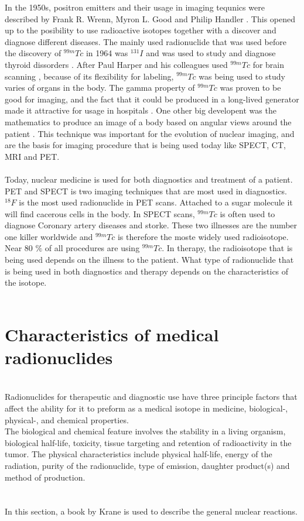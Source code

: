 \documentclass[twoside,english]{uiofysmaster/uiofysmaster}
\begin{document}
In the 1950s,  positron emitters and their usage in imaging tequnics were described by Frank R. Wrenn, Myron L. Good and Philip Handler \cite{Wrenn1951}. This opened up to the posibility to use radioactive isotopes together with a discover and diagnose different diseases. The mainly used radionuclide that was used before the discovery of $^{99m}Tc$ in 1964 \cite{harper_tc99m} was $^{131}I$ and was used to study and diagnose thyroid dissorders \cite{Cherry2012_chap1}. After Paul Harper and his colleagues used $^{99m}Tc$ for brain scanning \cite{harper_tc99m},  because of its flexibility for labeling, $^{99m}Tc$ was being used to study varies of organs in the body. The gamma property of $^{99m}Tc$ was proven to be good for imaging, and the fact that it could be produced in a long-lived generator made it attractive for usage in hospitals \cite{harper_tc99m}. One other big developent was the mathematics to produce an image of a body based on angular views around the patient \cite{Cherry2012_chap1}. This technique was important for the evolution of nuclear imaging, and are the basis for imaging procedure that is being used today like SPECT, CT, MRI and PET.
\\
\\
Today, nuclear medicine is used for both diagnostics and treatment of a patient. PET and SPECT is two imaging techniques that are most used in diagnostics. $^{18}F$ is the most used radionuclide in PET scans. Attached to a sugar molecule it will find cacerous cells in the body. In SPECT scans, $^{99m}Tc$ is often used to diagnose Coronary artery diseases and storke. These two illnesses are the number one killer worldwide and $^{99m}Tc$ is therefore the moste widely used radioisotope. Near 80 $\%$ of all procedures are using $^{99m}Tc$. In therapy, the radioisotope that is being used depends on the illness to the patient. What type of radionuclide that is being used in both diagnostics and therapy depends on the characteristics of the isotope.   
\\
\\

\section{Characteristics of medical radionuclides}
\noindent
\\
Radionuclides for therapeutic and diagnostic use have three principle factors that affect the ability for it to preform as a medical isotope in medicine\cite{invivo}, biological-, physical-, and chemical properties.\\
The biological and chemical feature involves the stability in a living organism, biological half-life, toxicity, tissue targeting and retention of radioactivity in the tumor\cite{Yeong}.
The physical characteristics include physical half-life, energy of the radiation, purity of the radionuclide, type of emission, daughter product(s) and method of production\cite{Yeong}. \\
\\\\
In this section, a book by Krane\cite{Krane} is used to describe the general nuclear reactions.\\
\end{document}
